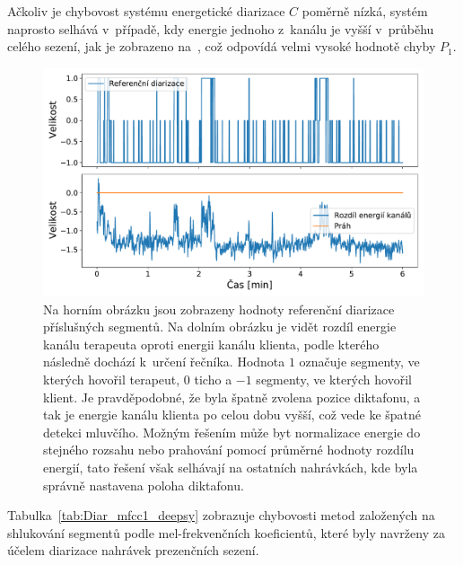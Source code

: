 Ačkoliv je chybovost systému energetické diarizace $C$ poměrně nízká, systém naprosto selhává v~případě, kdy energie jednoho z~kanálu je vyšší v~průběhu celého sezení, jak je zobrazeno na~, což odpovídá velmi vysoké hodnotě chyby $P_{1}$.

\begin{figure}[ht]
  \centering
  \includegraphics[width=\linewidth]{obrazky-figures/energy_diff.pdf}
  \caption{Na horním obrázku jsou zobrazeny hodnoty referenční diarizace příslušných segmentů. Na dolním obrázku je vidět rozdíl energie kanálu terapeuta oproti energii kanálu klienta, podle kterého následně dochází k~určení řečníka. Hodnota $1$ označuje segmenty, ve kterých hovořil terapeut, $0$ ticho a $-1$ segmenty, ve kterých hovořil klient. Je pravděpodobné, že byla špatně zvolena pozice diktafonu, a tak je energie kanálu klienta po celou dobu vyšší, což vede ke špatné detekci mluvčího. Možným řešením může byt normalizace energie do stejného rozsahu nebo prahování pomocí průměrné hodnoty rozdílu energií, tato řešení však selhávají na ostatních nahrávkách, kde byla správně nastavena poloha diktafonu.}
  \label{fig:Energy_diar_failure}
\end{figure}

Tabulka~\ref{tab:Diar_mfcc1_deepsy} zobrazuje chybovosti metod založených na shlukování segmentů podle mel-frekvenčních koeficientů, které byly navrženy za účelem diarizace nahrávek prezenčních sezení.

